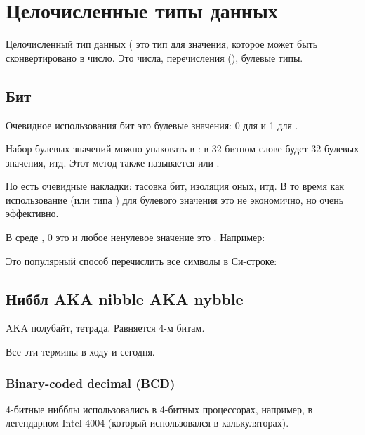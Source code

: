 \section{Целочисленные типы данных}

Целочисленный тип данных ( это тип для значения, которое может быть сконвертировано в число.
Это числа, перечисления (), булевые типы.

\subsection{Бит}

Очевидное использования бит это булевые значения: 0 для  и 1 для .

Набор булевых значений можно упаковать в : в 32-битном слове будет 32 булевых значения, итд.
Этот метод также называется  или .

Но есть очевидные накладки: тасовка бит, изоляция оных, итд.
В то время как использование  (или типа ) для булевого значения это не экономично,
но очень эффективно.

В среде \CCpp, 0 это  и любое ненулевое значение это .
Например:



Это популярный способ перечислить все символы в Си-строке:



\subsection{Ниббл AKA nibble AKA nybble}

\ac{AKA} полубайт, тетрада.
Равняется 4-м битам.

Все эти термины в ходу и сегодня.

\subsubsection{Binary-coded decimal (\ac{BCD})}
\label{BCD}


4-битные нибблы использовались в 4-битных процессорах, например, в легендарном Intel 4004 (который использовался в
калькуляторах).

